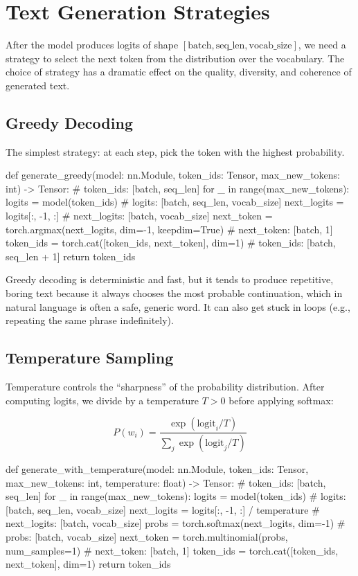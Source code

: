 \section{Text Generation Strategies}

After the model produces logits of shape $[\text{batch}, \text{seq\_len},
\text{vocab\_size}]$, we need a strategy to select the next token from the
distribution over the vocabulary. The choice of strategy has a dramatic effect
on the quality, diversity, and coherence of generated text.

\subsection{Greedy Decoding}

The simplest strategy: at each step, pick the token with the highest
probability.

\begin{pseudocode}
def generate_greedy(model: nn.Module, token_ids: Tensor,
                    max_new_tokens: int) -> Tensor:
    # token_ids: [batch, seq_len]
    for _ in range(max_new_tokens):
        logits = model(token_ids)
        # logits: [batch, seq_len, vocab_size]
        next_logits = logits[:, -1, :]
        # next_logits: [batch, vocab_size]
        next_token = torch.argmax(next_logits, dim=-1, keepdim=True)
        # next_token: [batch, 1]
        token_ids = torch.cat([token_ids, next_token], dim=1)
        # token_ids: [batch, seq_len + 1]
    return token_ids
\end{pseudocode}

Greedy decoding is deterministic and fast, but it tends to produce repetitive,
boring text because it always chooses the most probable continuation, which in
natural language is often a safe, generic word. It can also get stuck in loops
(e.g., repeating the same phrase indefinitely).

\subsection{Temperature Sampling}

Temperature controls the ``sharpness'' of the probability distribution. After
computing logits, we divide by a temperature $T > 0$ before applying softmax:

\[
  P(w_i) = \frac{\exp(\text{logit}_i / T)}{\sum_j \exp(\text{logit}_j / T)}
\]

\begin{pseudocode}
def generate_with_temperature(model: nn.Module, token_ids: Tensor,
                              max_new_tokens: int, temperature: float) -> Tensor:
    # token_ids: [batch, seq_len]
    for _ in range(max_new_tokens):
        logits = model(token_ids)
        # logits: [batch, seq_len, vocab_size]
        next_logits = logits[:, -1, :] / temperature
        # next_logits: [batch, vocab_size]
        probs = torch.softmax(next_logits, dim=-1)
        # probs: [batch, vocab_size]
        next_token = torch.multinomial(probs, num_samples=1)
        # next_token: [batch, 1]
        token_ids = torch.cat([token_ids, next_token], dim=1)
    return token_ids
\end{pseudocode}


